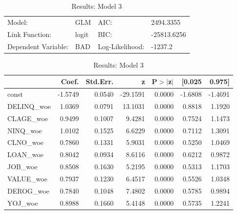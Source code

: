 \begin{table}[H]
\renewcommand{\arraystretch}{1.25}
\begin{center}
\begin{tabular}{llll}
\hline
Model:              & GLM              & AIC:            & 2494.3355    \\
Link Function:      & logit            & BIC:            & -25813.6256  \\
Dependent Variable: & BAD              & Log-Likelihood: & -1237.2      \\
\hline
\end{tabular}
\end{center}
\begin{center}
\begin{tabular}{lrrrrrr}
\hline
            &  Coef.  & Std.Err. &    z     & P$> |$z$|$ &  [0.025 &  0.975]  \\
\hline
\hline
const       & -1.5749 &   0.0540 & -29.1591 &      0.0000 & -1.6808 & -1.4691  \\
DELINQ\_woe &  1.0369 &   0.0791 &  13.1031 &      0.0000 &  0.8818 &  1.1920  \\
CLAGE\_woe  &  0.9499 &   0.1007 &   9.4281 &      0.0000 &  0.7524 &  1.1473  \\
NINQ\_woe   &  1.0102 &   0.1525 &   6.6229 &      0.0000 &  0.7112 &  1.3091  \\
CLNO\_woe   &  0.7860 &   0.1331 &   5.9031 &      0.0000 &  0.5250 &  1.0469  \\
LOAN\_woe   &  0.8042 &   0.0934 &   8.6116 &      0.0000 &  0.6212 &  0.9872  \\
JOB\_woe    &  0.8508 &   0.1630 &   5.2195 &      0.0000 &  0.5313 &  1.1703  \\
VALUE\_woe  &  0.7937 &   0.1230 &   6.4517 &      0.0000 &  0.5526 &  1.0348  \\
DEROG\_woe  &  0.7840 &   0.1048 &   7.4802 &      0.0000 &  0.5785 &  0.9894  \\
YOJ\_woe    &  0.8988 &   0.1660 &   5.4148 &      0.0000 &  0.5735 &  1.2241  \\
\hline
\end{tabular}
\end{center}
\caption{Results: Model 3 \label{table:results_3}}
\end{table}


